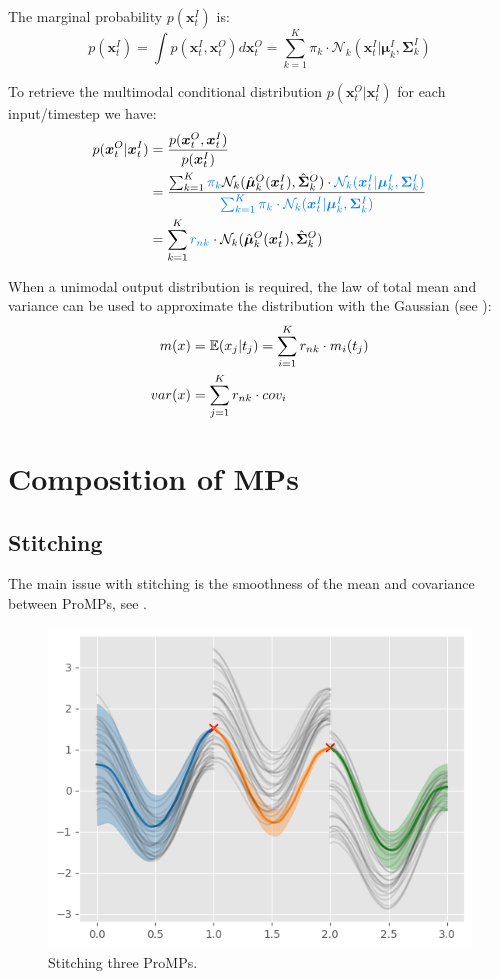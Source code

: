 \documentclass{article}
\begin{document}
The marginal probability $p(\bm{x}_{t}^{I})$ is:
\begin{equation}
  p(\bm{x}_{t}^{I}) = \int p(\bm{x}_{t}^{I}, \bm{x}_{t}^{O})d\bm{x}_{t}^{O} = \sum_{k=1}^{K} \pi_{k} \cdot \mathcal{N}_{k}(\bm{x}_{t}^{I}|\bm{\mu}_{k}^{I}, \bm{\Sigma}_{k}^{I})
\end{equation}

To retrieve the multimodal conditional distribution $p(\bm{x}_{t}^{O}|\bm{x}_{t}^{I})$ for each input/timestep we have:
\begin{align}
  p(\bm{x}_{t}^{O}|\bm{x}_{t}^{I}) &= \frac{p(\bm{x}_{t}^{O},\bm{x}_{t}^{I})}{p(\bm{x}_{t}^{I})}\\
  &= \frac{\sum_{k=1}^{K}\textcolor[rgb]{0,0.5,1}{\pi_{k}} \mathcal{N}_{k}(\hat{\bm{\mu}}_{k}^{O}(\bm{x}_{t}^{I}), \hat{\bm{\Sigma}}_{k}^{O}) \cdot \textcolor[rgb]{0,0.5,1}{\mathcal{N}_{k}(\bm{x}_{t}^{I}|\bm{\mu}_{k}^{I}, \bm{\Sigma}_{k}^{I})}}{\textcolor[rgb]{0,0.5,1}{\sum_{k=1}^{K} \pi_{k} \cdot \mathcal{N}_{k}(\bm{x}_{t}^{I}|\bm{\mu}_{k}^{I}, \bm{\Sigma}_{k}^{I})}}\\
  &= \sum_{k=1}^{K} \textcolor[rgb]{0,0.5,1}{r_{nk}} \cdot \mathcal{N}_{k}(\hat{\bm{\mu}}_{k}^{O}(\bm{x}_{t}^{I}), \hat{\bm{\Sigma}}_{k}^{O})
\end{align}

When a unimodal output distribution is required, the law of total mean and variance can be used to approximate the distribution with the Gaussian (see ):
\begin{align}
  m(x) &= \operatorname{\mathbb{E}}(x_{j}|t_{j}) = \sum_{i=1}^{K} r_{nk} \cdot m_{i}(t_{j})\label{eq:GMR:mean}\\
  var(x) &= \sum_{j=1}^{K} r_{nk} \cdot cov_{i}\label{eq:GMR:var}
\end{align}


\section{Composition of MPs}
\subsection{Stitching}
The main issue with stitching is the smoothness of the mean and covariance between ProMPs, see .
\begin{figure}[htbp]
  \centering
  \includegraphics[width=0.5\linewidth]{fig/stitching.png}
  \caption{Stitching three ProMPs.}
  \label{fig:stitching}
\end{figure}
\end{document}
